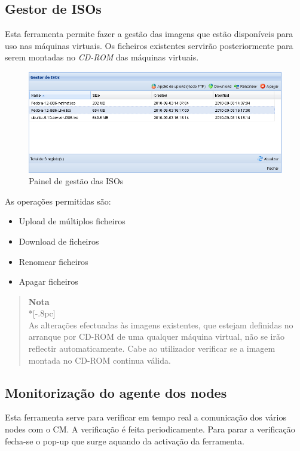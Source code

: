 \subsection{Gestor de ISOs}
\label{sec:iso_manager}
Esta ferramenta permite fazer a gestão das imagens que estão disponíveis para uso nas máquinas virtuais.
Os ficheiros existentes servirão posteriormente para serem montadas no \emph{CD-ROM} das máquinas virtuais.

\begin{figure}[H]
	\begin{center}
	\includegraphics[scale=0.5]{screenshots/iso_manager.png}
	\caption{Painel de gestão das ISOs}
	\label{fig:iso_manager}
	\end{center}
\end{figure}

As operações permitidas são:
\begin{itemize}
\item Upload de múltiplos ficheiros
\item Download de ficheiros
\item Renomear ficheiros
\item Apagar ficheiros
\end{itemize}


\begin{quote}
	{\large \bf Nota} \\*[-.8pc]
	\underline{\hspace{6in}} \\
	As alterações efectuadas às imagens existentes, que estejam definidas no arranque por CD-ROM de uma qualquer máquina virtual,
     não se irão reflectir automaticamente. Cabe ao utilizador verificar se a imagem montada no CD-ROM continua válida.
\end{quote}

\subsection{Monitorização do agente dos nodes}
Esta ferramenta serve para verificar em tempo real a comunicação dos vários nodes com o CM. A verificação é feita periodicamente.
Para parar a verificação fecha-se o pop-up que surge aquando da activação da ferramenta.

